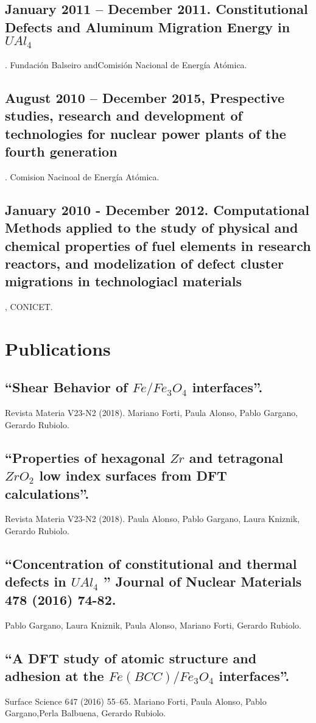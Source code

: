 \documentclass{my_cv}
\begin{document}
 \subsection{January 2011 – December 2011. Constitutional Defects and Aluminum Migration Energy in $UAl_4$}. Fundación Balseiro andComisión Nacional de Energía Atómica. 

\subsection{August 2010 – December 2015, Prespective studies, research and development of technologies for nuclear power plants of the fourth generation}. Comision Nacinoal de Energía Atómica.

 \subsection{January 2010 - December 2012. Computational Methods applied to the study of physical and chemical properties of fuel elements in research reactors, and modelization of defect cluster migrations in technologiacl materials}, CONICET.

\section{Publications}

\subsection{“Shear Behavior of $Fe/Fe_3O_4$ interfaces”. } Revista Materia V23-N2 (2018). Mariano Forti, Paula Alonso, Pablo Gargano, Gerardo Rubiolo. 

\subsection{“Properties of hexagonal $Zr$ and tetragonal $ZrO_2$ low index surfaces from DFT calculations”. } Revista Materia V23-N2 (2018). Paula Alonso, Pablo Gargano, Laura Kniznik, Gerardo Rubiolo. 

\subsection{“Concentration of constitutional and thermal defects in $UAl_4$ ” Journal of Nuclear Materials 478 (2016) 74-82. } Pablo Gargano, Laura Kniznik, Paula Alonso, Mariano Forti, Gerardo Rubiolo.

\subsection{“A DFT study of atomic structure and adhesion at the $Fe(BCC)/Fe_3 O_4$ interfaces”. } Surface Science 647 (2016) 55–65. Mariano Forti, Paula Alonso, Pablo Gargano,Perla Balbuena, Gerardo Rubiolo.
\end{document}
